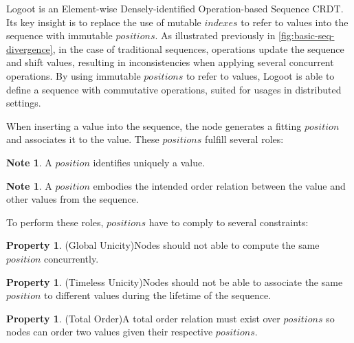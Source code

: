 \documentclass{article}
\theoremstyle{definition}
\newcounter{note-counter}
\theoremstyle{definition}
\newtheorem{note}[note-counter]{Note}
\newcounter{propertycounter}
\theoremstyle{definition}
\newtheorem{property}[propertycounter]{Property}
\theoremstyle{definition}
\begin{document}
Logoot is an Element-wise Densely-identified Operation-based Sequence \ac{CRDT}.
Its key insight is to replace the use of mutable $indexes$ to refer to values into the sequence with immutable $positions$.
As illustrated previously in \autoref{fig:basic-seq-divergence}, in the case of traditional sequences, operations update the sequence and shift values, resulting in inconsistencies when applying several concurrent operations.
By using immutable $positions$ to refer to values, Logoot is able to define a sequence with commutative operations, suited for usages in distributed settings.

When inserting a value into the sequence, the node generates a fitting $position$ and associates it to the value.
These $positions$ fulfill several roles:

\begin{note}
    A $position$ identifies uniquely a value.
\end{note}

\begin{note}
    A $position$ embodies the intended order relation between the value and other values from the sequence.
\end{note}


To perform these roles, $positions$ have to comply to several constraints:

\begin{property}(Global Unicity)\label{prop:global-unicity}
    Nodes should not able to compute the same $position$ concurrently.
\end{property}

\begin{property}(Timeless Unicity)\label{prop:timeless-unicity}
    Nodes should not be able to associate the same $position$ to different values during the lifetime of the sequence.
\end{property}

\begin{property}(Total Order)\label{prop:total-order}
    A total order relation must exist over $positions$ so nodes can order two values given their respective $positions$.
\end{property}
\end{document}

